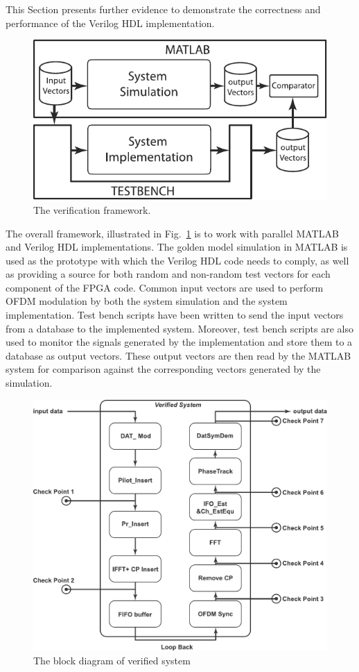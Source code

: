 This Section presents further evidence to demonstrate the correctness and performance of the Verilog HDL implementation. 
\begin{figure}
	\centering
	\includegraphics[width=0.9\columnwidth]{Figures/Veirification.pdf}
	\caption{The verification framework.}
	\label{fig:Ver}
\end{figure}
The overall framework, illustrated in Fig.~\ref{fig:Ver} is to work with parallel MATLAB and Verilog HDL implementations. The golden model simulation in MATLAB is used as the prototype with which the Verilog HDL code needs to comply, as well as providing a source for both random and non-random test vectors for each component of the FPGA code.
Common input vectors are used to perform OFDM modulation by both the system simulation and the system implementation. Test bench scripts have been written to send the input vectors from a database to the implemented system. Moreover, test bench scripts are also used to monitor the signals generated by the implementation and store them to a database as output vectors. These output vectors are then read by the MATLAB system for comparison against the corresponding vectors generated by the simulation.

\begin{figure}
	\centering
	\includegraphics[width=0.9\columnwidth]{Figures/VerifiedSystem.pdf}
	\caption{The block diagram of verified system}
	\label{fig:VerSys}
\end{figure}

